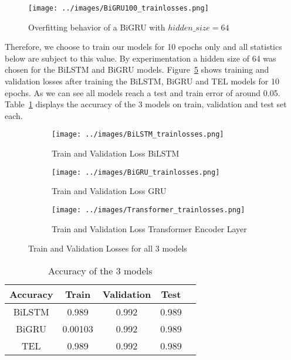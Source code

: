 \documentclass[utf8x]{ctexart}
\begin{document}
\begin{figure}[htb]
  \centering
  \texttt{[image: ../images/BiGRU100\_trainlosses.png]}
  \caption{Overfitting behavior of a BiGRU with $hidden\_size = 64$}
  \label{fig:overfitting}
\end{figure}




Therefore, we choose to train our models for 10 epochs only and all statistics below are subject to this value. By experimentation a hidden size of 64 was chosen for the BiLSTM and BiGRU models.
Figure~\ref{fig:losses1} shows training and validation losses after training the BiLSTM, BiGRU and TEL models for 10 epochs. As we can see all models reach a test and train error of around 0.05. Table~\ref{tab:accuracy} displays the accuracy of the 3 models on train, validation and test set each.


\begin{figure}[htb]
  \centering
  \begin{subfigure}[b]{0.48\textwidth}
    \centering
    \texttt{[image: ../images/BiLSTM\_trainlosses.png]}
    \caption{Train and Validation Loss BiLSTM}
    \label{fig:BiLSTM_trainlosses}
  \end{subfigure}
  \begin{subfigure}[b]{0.48\textwidth}
    \centering
    \texttt{[image: ../images/BiGRU\_trainlosses.png]}
    \caption{Train and Validation Loss GRU}
    \label{fig:BiGRU_trainlosses}
  \end{subfigure}
  \begin{subfigure}[b]{0.48\textwidth}
    \centering
    \texttt{[image: ../images/Transformer\_trainlosses.png]}
    \caption{Train and Validation Loss Transformer Encoder Layer}
    \label{fig:TEL_trainlosses}
  \end{subfigure}
  \caption{Train and Validation Losses for all 3 models}
  \label{fig:losses1}
\end{figure}



\begin{table}[ht]
  \centering
  \caption{Accuracy of the 3 models}
  \label{tab:accuracy}
  \begin{tabular}{c|cccc}
    Accuracy & Train   & Validation & Test  \\
    \hline
    BiLSTM   & 0.989   & 0.992      & 0.989 \\
    BiGRU    & 0.00103 & 0.992      & 0.989 \\
    TEL      & 0.989   & 0.992      & 0.989 \\
  \end{tabular}
\end{table}
\end{document}
